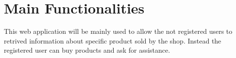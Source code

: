 \section{Main Functionalities}

This web application will be mainly used to allow the not registered users to retrived information about specific product sold by the shop. Instead the registered user can buy products and ask for assistance.